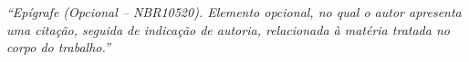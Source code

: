 \begin{epigrafe}
    \vspace*{\fill}
	\begin{flushright}
		\textit{``Epígrafe (Opcional – NBR10520). 
		Elemento opcional, no qual o autor apresenta uma citação, 
		seguida de indicação de autoria, 
		relacionada à matéria tratada no corpo do trabalho.''}
	\end{flushright}
\end{epigrafe}


